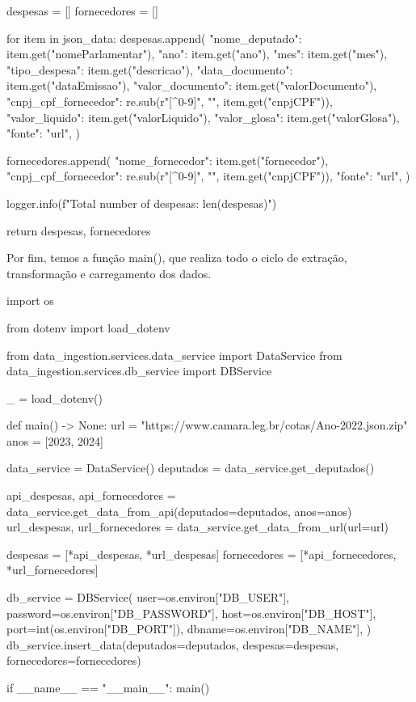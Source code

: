 \documentclass[12pt, a4paper]{article}
\begin{document}
\begin{python}
		despesas = []
		fornecedores = []
	
		for item in json_data:
			despesas.append({
				"nome_deputado": item.get("nomeParlamentar"),
				"ano": item.get("ano"),
				"mes": item.get("mes"),
				"tipo_despesa": item.get("descricao"),
				"data_documento": item.get("dataEmissao"),
				"valor_documento": item.get("valorDocumento"),
				"cnpj_cpf_fornecedor": re.sub(r"[^0-9]", "", item.get("cnpjCPF")),
				"valor_liquido": item.get("valorLiquido"),
				"valor_glosa": item.get("valorGlosa"),
				"fonte": "url",
			})
		
			fornecedores.append({
				"nome_fornecedor": item.get("fornecedor"),
				"cnpj_cpf_fornecedor": re.sub(r"[^0-9]", "", item.get("cnpjCPF")),
				"fonte": "url",
			})
		
		logger.info(f"Total number of despesas: {len(despesas)}")
		
		return despesas, fornecedores

\end{python}


Por fim, temos a função main(), que realiza todo o ciclo de extração, transformação e carregamento dos dados.

\begin{python}
import os

from dotenv import load_dotenv

from data_ingestion.services.data_service import DataService
from data_ingestion.services.db_service import DBService

_ = load_dotenv()


def main() -> None:
	url = "https://www.camara.leg.br/cotas/Ano-2022.json.zip"
	anos = [2023, 2024]
	
	data_service = DataService()
	deputados = data_service.get_deputados()
	
	api_despesas, api_fornecedores = data_service.get_data_from_api(deputados=deputados, anos=anos)
	url_despesas, url_fornecedores = data_service.get_data_from_url(url=url)
	
	despesas = [*api_despesas, *url_despesas]
	fornecedores = [*api_fornecedores, *url_fornecedores]
	
	db_service = DBService(
	    user=os.environ["DB_USER"],
	    password=os.environ["DB_PASSWORD"],
	    host=os.environ["DB_HOST"],
	    port=int(os.environ["DB_PORT"]),
	    dbname=os.environ["DB_NAME"],
	)
	db_service.insert_data(deputados=deputados, despesas=despesas, fornecedores=fornecedores)


if __name__ == "__main__":
	main()
	
\end{python}
\end{document}
